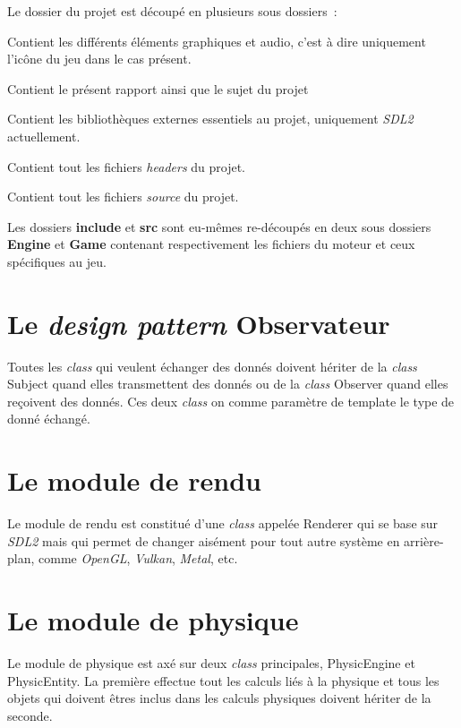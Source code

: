 \documentclass[10pt, french, a4paper]{report}
\newcommand{\class}[1]{{\codefont \NoAutoSpacing \mbox{#1}}}
\begin{document}
Le dossier du projet est découpé en plusieurs sous dossiers~:
\begin{description}[leftmargin=!,labelwidth=\widthof{\bfseries documents}]
	\item [assets] Contient les différents éléments graphiques et audio, c'est à dire 
	               uniquement l'icône du jeu dans le cas présent.
	\item [documents] Contient le présent rapport ainsi que le sujet du projet
	\item [external] Contient les bibliothèques externes essentiels au projet, 
	                 uniquement \textit{SDL2} actuellement.
	\item [include] Contient tout les fichiers \textit{headers} du projet.
	\item [src] Contient tout les fichiers \textit{source} du projet.
\end{description}

Les dossiers \textbf{include} et \textbf{src} sont eu-mêmes re-découpés en deux sous dossiers \textbf{Engine} et \textbf{Game} contenant respectivement les fichiers
du moteur et ceux spécifiques au jeu.

\section{Le \textit{design pattern} Observateur}

Toutes les \textit{class} qui veulent échanger des donnés doivent hériter de la 
\textit{class} \class{Subject} quand elles transmettent des donnés ou de la 
\textit{class} \class{Observer} quand elles reçoivent des donnés. Ces deux \textit{class} on comme paramètre de template le type de donné échangé.

\section{Le module de rendu}

Le module de rendu est constitué d'une \textit{class} appelée \class{Renderer} qui 
se base sur \textit{SDL2} mais qui permet de changer aisément pour tout autre 
système en arrière-plan, comme \textit{OpenGL}, \textit{Vulkan}, \textit{Metal}, etc. 


\section{Le module de physique}

Le module de physique est axé sur deux \textit{class} principales, 
\class{PhysicEngine} et \\ \class{PhysicEntity}. 
La première effectue tout les calculs liés à la physique et 
tous les objets qui doivent êtres inclus dans les calculs physiques doivent hériter
de la seconde.
\end{document}
